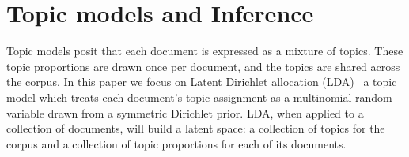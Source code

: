 \section{Topic models and Inference}
\label{sec:models}




Topic models posit that each document is expressed as a mixture of
topics.  These topic proportions are drawn once per document, and the
topics are shared across the corpus.  In this paper we focus on Latent
Dirichlet allocation (LDA)~\cite{blei-03} a topic model which treats
each document's topic assignment as a multinomial random variable
drawn from a symmetric Dirichlet prior.  LDA, when applied to a
collection of documents, will build a latent space: a collection of
topics for the corpus and a collection of topic proportions for each
of its documents.  

